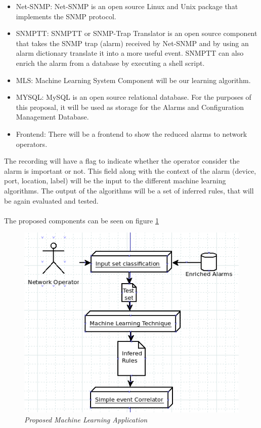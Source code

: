 \documentclass[10pt,a4paper]{article}
\begin{document}
\begin{itemize}
  \item Net-SNMP: Net-SNMP is an open source Linux and Unix package that implements the SNMP protocol.\cite{netsnmp}
  \item SNMPTT: SNMPTT or SNMP-Trap Translator is an open source component that takes the SNMP trap (alarm) received by Net-SNMP and by using an alarm dictionary translate it into a more useful event. SNMPTT can also enrich the alarm from a database by executing a shell script.\cite{snmptt}
  \item MLS: Machine Learning System Component will be our learning algorithm.\cite{sec}
  \item MYSQL: MySQL is an open source relational database. For the purposes of this proposal, it will be used as storage for the Alarms and Configuration Management Database.
  \item Frontend: There will be a frontend to show the reduced alarms to network operators.
\end{itemize}

The recording will have a flag to indicate whether the operator consider the alarm is important or not. This field along with the context of the alarm (device, port, location, label) will be the input to the different machine learning algorithms. The output of the algorithms will be a set of inferred rules, that will be again evaluated and tested.
\\\\
The proposed components can be seen on figure \ref{fig:ml_componentdiagram}

\begin{figure}[H]
 \includegraphics[scale=0.7]{ML_ProposedComponents.png}
  \centering
  \caption{\textit{Proposed Machine Learning Application}}
  \label{fig:ml_componentdiagram}
\end{figure}	
\end{document}
